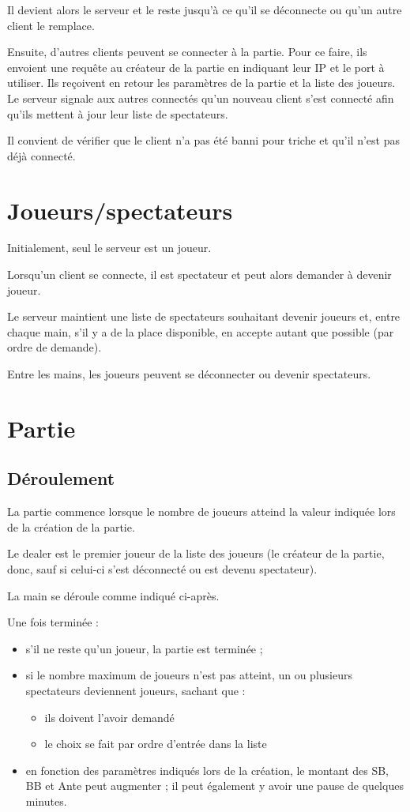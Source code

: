 \documentclass[a4paper]{article}
\begin{document}
Il devient alors le serveur et le reste jusqu'à ce qu'il se déconnecte ou qu'un autre client le remplace.

Ensuite, d'autres clients peuvent se connecter à la partie.
Pour ce faire, ils envoient une requête au créateur de la partie en indiquant leur IP et le port à utiliser.
Ils reçoivent en retour les paramètres de la partie et la liste des joueurs.
Le serveur signale aux autres connectés qu'un nouveau client s'est connecté afin qu'ils mettent à jour leur liste de spectateurs.

Il convient de vérifier que le client n'a pas été banni pour triche et qu'il n'est pas déjà connecté.

\section{Joueurs/spectateurs}

Initialement, seul le serveur est un joueur.

Lorsqu'un client se connecte, il est spectateur et peut alors demander à devenir joueur.

Le serveur maintient une liste de spectateurs souhaitant devenir joueurs et, entre chaque main, s'il y a de la place disponible, en accepte autant que possible (par ordre de demande).

Entre les mains, les joueurs peuvent se déconnecter ou devenir spectateurs.

\section{Partie}

\subsection{Déroulement}

La partie commence lorsque le nombre de joueurs atteind la valeur indiquée lors de la création de la partie.

Le dealer est le premier joueur de la liste des joueurs (le créateur de la partie, donc, sauf si celui-ci s'est déconnecté ou est devenu spectateur).

La main se déroule comme indiqué ci-après.

Une fois terminée :
\begin{itemize}
	\item s'il ne reste qu'un joueur, la partie est terminée ;
	\item si le nombre maximum de joueurs n'est pas atteint, un ou plusieurs spectateurs deviennent joueurs, sachant que :
	\begin{itemize}
		\item ils doivent l'avoir demandé
		\item le choix se fait par ordre d'entrée dans la liste
	\end{itemize}
	\item en fonction des paramètres indiqués lors de la création, le montant des SB, BB et Ante peut augmenter ; il peut également y avoir une pause de quelques minutes.
\end{itemize}
\end{document}
